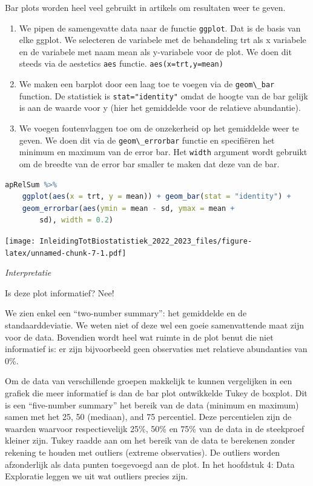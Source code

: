 \documentclass[
  12pt,dutch,coursenotes]{book}
\newcommand{\passthrough}[1]{#1}
\begin{document}
Bar plots worden heel veel gebruikt in artikels om resultaten weer te geven.

\begin{enumerate}
\def\labelenumi{\arabic{enumi}.}
\item
  We pipen de samengevatte data naar de functie \passthrough{\lstinline!ggplot!}. Dat is de basis van elke ggplot. We selecteren de variabele met de behandeling trt als x variabele en de variabele met naam mean als y-variabele voor de plot.
  We doen dit steeds via de aestetics \passthrough{\lstinline!aes!} functie. \passthrough{\lstinline!aes(x=trt,y=mean)!}
\item
  We maken een barplot door een laag toe te voegen via de \passthrough{\lstinline!geom\_bar!} function. De statistiek is \passthrough{\lstinline!stat="identity"!} omdat de hoogte van de bar gelijk is aan de waarde voor y (hier het gemiddelde voor de relatieve abundantie).
\item
  We voegen foutenvlaggen toe om de onzekerheid op het gemiddelde weer te geven. We doen dit via de \passthrough{\lstinline!geom\_errorbar!} functie en specifiëren het minimum en maximum van de error bar. Het \passthrough{\lstinline!width!} argument wordt gebruikt om de breedte van de error bar smaller te maken dat deze van de bar.
\end{enumerate}

\begin{lstlisting}[language=R]
apRelSum %>%
    ggplot(aes(x = trt, y = mean)) + geom_bar(stat = "identity") +
    geom_errorbar(aes(ymin = mean - sd, ymax = mean +
        sd), width = 0.2)
\end{lstlisting}

\texttt{[image: InleidingTotBiostatistiek\_2022\_2023\_files/figure-latex/unnamed-chunk-7-1.pdf]}

\emph{Interpretatie}

Is deze plot informatief? Nee!

We zien enkel een ``two-number summary'': het gemiddelde en de standaarddeviatie. We weten niet of deze wel een goeie samenvattende maat zijn voor de data. Bovendien wordt heel wat ruimte in de plot benut die niet informatief is: er zijn bijvoorbeeld geen observaties met relatieve abundanties van 0\%.

Om de data van verschillende groepen makkelijk te kunnen vergelijken in een grafiek die meer informatief is dan de bar plot ontwikkelde Tukey de boxplot. Dit is een ``five-number summary'' het bereik van de data (minimum en maximum) samen met het 25, 50 (mediaan), and 75 percentiel. Deze percentielen zijn de waarden waarvoor respectievelijk 25\%, 50\% en 75\% van de data in de steekproef kleiner zijn. Tukey raadde aan om het bereik van de data te berekenen zonder rekening te houden met outliers (extreme observaties). De outliers worden afzonderlijk als data punten toegevoegd aan de plot. In het hoofdstuk 4: Data Exploratie leggen we uit wat outliers precies zijn.
\end{document}
